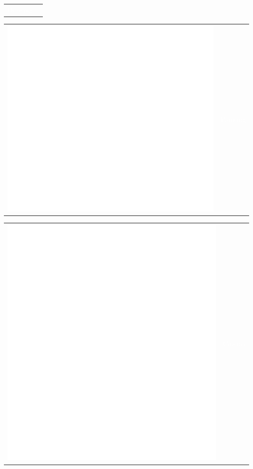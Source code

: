 \documentclass[letterpaper]{article}
\begin{document}
\begin{minipage}{1\linewidth}
{\begin{minipage}{0.47\linewidth}
\begin{minipage}{0.3\linewidth}
\begin{tabularx}{1\textwidth}{rr}
			\textcolor{white}{Drawing}
		\end{tabularx}	
	\end{minipage}
	\begin{minipage}{0.3\linewidth}
		\vspace{1ex}
		\begin{tabularx}{1\textwidth}{rr}
			\includegraphics[width=0.15\linewidth]{art-palette.eps} & 
			\textcolor{white}{Painting}
		\end{tabularx}	
	\end{minipage}
	\begin{minipage}{0.3\linewidth}
		\vspace{1ex}
		\begin{tabularx}{1\textwidth}{rr}
			\includegraphics[width=0.15\linewidth]{film-roll.eps} & 
			\textcolor{white}{Cinema}
		\end{tabularx}	
	\end{minipage}		
\end{minipage}
} %
%
\hfill
%
\begin{minipage}{0.5\linewidth}
	\begin{minipage}{1\linewidth}
		\centering
		\vspace{2ex}
	\end{minipage}
	\begin{minipage}{1\linewidth}
		\vspace{2ex}
		\begin{minipage}{1\linewidth}		
			\\
			\vspace{2ex}
		\end{minipage}

\end{minipage}
\end{minipage}
\end{minipage}
\end{document}
